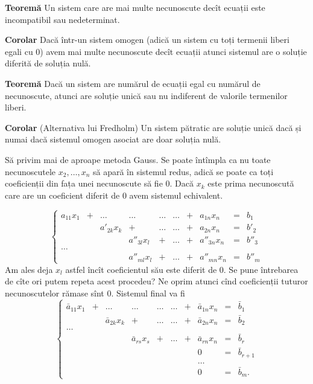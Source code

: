 \documentclass[11pt]{article}
\begin{document}
\textbf{Teoremă} Un sistem care are mai multe necunoscute decît ecuații
este incompatibil sau nedeterminat.

\textbf{Corolar} Dacă într-un sistem omogen (adică un sistem cu toți
termenii liberi egali cu \(0\)) avem mai multe necunoscute decît ecuații
atunci sistemul are o soluție diferită de soluția nulă.

\textbf{Teoremă} Dacă un sistem are numărul de ecuații egal cu numărul
de necunoscute, atunci are soluție unică sau nu indiferent de valorile
termenilor liberi.

\textbf{Corolar} (Alternativa lui Fredholm) Un sistem pătratic are
soluție unică dacă și numai dacă sistemul omogen asociat are doar
soluția nulă.

Să privim mai de aproape metoda Gauss. Se poate întîmpla ca nu toate
necunoscutele \(x_2,\dots,x_n\) să apară în sistemul redus, adică se
poate ca toți coeficienții din fața unei necunoscute să fie \(0\). Dacă
\(x_k\) este prima necunoscută care are un coeficient diferit de \(0\)
avem sistemul echivalent.

\[
 \left\{\begin{matrix}a_{11}x_1 & + & \dots & \dots & \dots & \dots & + & a_{1n}x_n & = & b_1 \\
 & & a'_{2k}x_k & + & \dots & \dots &  + & a_{2n}x_n & = &  b'_2 \\
 & & & a''_{3l}x_l & +& \dots & + & a''_{3n}x_n & = & b''_3 \\
 \ldots \\
 & & &  a''_{ml}x_l & + & \dots & + & a''_{mn}x_n & = & b''_m 
 \end{matrix}\right.
 \] Am ales deja \(x_l\) astfel încît coeficientul său este diferit de
\(0\). Se pune întrebarea de cîte ori putem repeta acest procedeu? Ne
oprim atunci cînd coeficienții tuturor necunoscutelor rămase sînt \(0\).
Sistemul final va fi \[
 \left\{
 \begin{matrix}
 \bar{a}_{11}x_1 & + & \dots & \dots & \dots & \dots & + & \bar{a}_{1n}x_n & = & \bar{b}_1 \\
 & & \bar{a}_{2k}x_k & + & \dots & \dots & + & \bar{a}_{2n}x_n & = & \bar{b}_2 \\
 \ldots \\
 & & & \bar{a}_{rs}x_s & + & \dots &  + & \bar{a}_{rn}x_n & = & \bar{b}_r \\
 & & & & & & & 0 & = & \bar{b}_{r+1} \\
 & & & & & & & \ldots \\
 & & & & & & & 0 & = & \bar{b}_m. 
 \end{matrix}
 \right.
 \]
\end{document}
